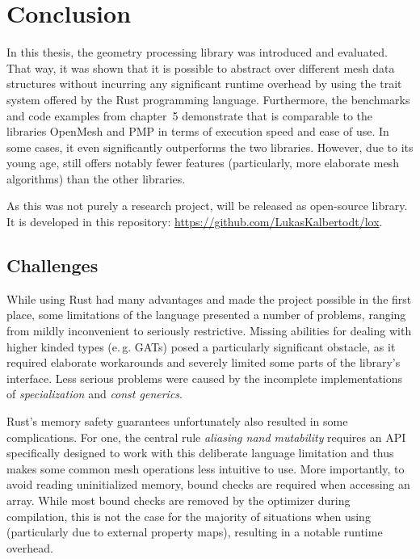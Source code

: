 \chapter{Conclusion}

In this thesis, the geometry processing library  was introduced and evaluated.
That way, it was shown that it is possible to abstract over different mesh data structures without incurring any significant runtime overhead by using the trait system offered by the Rust programming language.
Furthermore, the benchmarks and code examples from chapter~5 demonstrate that  is comparable to the \cpp libraries OpenMesh and PMP in terms of execution speed and ease of use.
In some cases, it even significantly outperforms the two \cpp libraries.
However, due to its young age,  still offers notably fewer features (particularly, more elaborate mesh algorithms) than the other libraries.



As this was not purely a research project,  will be released as open-source library.
It is developed in this repository: \url{https://github.com/LukasKalbertodt/lox}.

\vfill
\section{Challenges}

While using Rust had many advantages and made the project possible in the first place, some limitations of the language presented a number of problems, ranging from mildly inconvenient to seriously restrictive.
Missing abilities for dealing with higher kinded types (e.\,g. GATs) posed a particularly significant obstacle, as it required elaborate workarounds and severely limited some parts of the library's interface.
Less serious problems were caused by the incomplete implementations of \emph{specialization} and \emph{const generics}.

Rust's memory safety guarantees unfortunately also resulted in some complications.
For one, the central rule \emph{aliasing nand mutability} requires an API specifically designed to work with this deliberate language limitation and thus makes some common mesh operations less intuitive to use.
More importantly, to avoid reading uninitialized memory, bound checks are required when accessing an array.
While most bound checks are removed by the optimizer during compilation, this is not the case for the majority of situations when using  (particularly due to external property maps), resulting in a notable runtime overhead.

